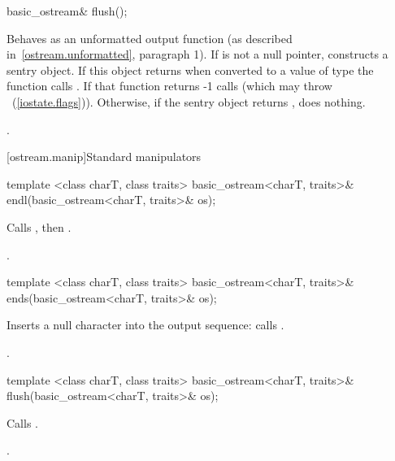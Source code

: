 %
\begin{itemdecl}
basic_ostream& flush();
\end{itemdecl}

\begin{itemdescr}
\pnum
\effects Behaves as an unformatted output function (as described in~\ref{ostream.unformatted}, paragraph 1).
If
is not a null pointer,
constructs a sentry object. If this object returns  when converted to a value of type  the function
calls
.
If that function returns -1
calls
(which may throw
~(\ref{iostate.flags})).
Otherwise, if the sentry object returns , does nothing.

\pnum
\returns
{}.
\end{itemdescr}

[ostream.manip]{Standard  manipulators}

%
\begin{itemdecl}
template <class charT, class traits>
  basic_ostream<charT, traits>& endl(basic_ostream<charT, traits>& os);
\end{itemdecl}

\begin{itemdescr}
\pnum
\effects
Calls
,
then
.

\pnum
\returns
{}.
\end{itemdescr}

%
\begin{itemdecl}
template <class charT, class traits>
  basic_ostream<charT, traits>& ends(basic_ostream<charT, traits>& os);
\end{itemdecl}

\begin{itemdescr}
\pnum
\effects
Inserts a null character into the output sequence:
calls
.

\pnum
\returns
{}.
\end{itemdescr}

%
\begin{itemdecl}
template <class charT, class traits>
  basic_ostream<charT, traits>& flush(basic_ostream<charT, traits>& os);
\end{itemdecl}

\begin{itemdescr}
\pnum
\effects
Calls
.

\pnum
\returns
{}.
\end{itemdescr}

